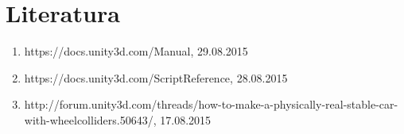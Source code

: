 \section{Literatura}
\begin{enumerate}
	\item https://docs.unity3d.com/Manual, 29.08.2015
	\item https://docs.unity3d.com/ScriptReference, 28.08.2015
	\item http://forum.unity3d.com/threads/how-to-make-a-physically-real-stable-car-with-wheelcolliders.50643/, 17.08.2015
\end{enumerate}